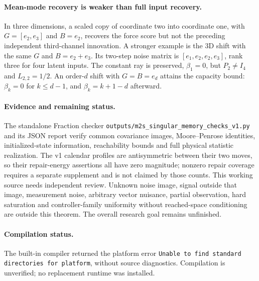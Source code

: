 \documentclass[11pt]{article}
\begin{document}
\paragraph{Mean-mode recovery is weaker than full input recovery.}
In three dimensions, a scaled copy of coordinate two into coordinate one,
with $G=[e_2,e_3]$ and $B=e_2$, recovers the force score but not the preceding
independent third-channel innovation.
A stronger example is the 3D shift with the same $G$ and $B=e_2+e_3$.
Its two-step noise matrix is $[e_1,e_2,e_2,e_3]$, rank three for four latent
inputs. The constant ray is preserved, $\beta_1=0$, but $P_2\ne I_4$ and
$L_{2,2}=1/2$.
An order-$d$ shift with $G=B=e_d$ attains the capacity bound:
$\beta_k=0$ for $k\le d-1$, and $\beta_k=k+1-d$ afterward.

\paragraph{Evidence and remaining status.}
The standalone Fraction checker
\texttt{outputs/m2s\_singular\_memory\_checks\_v1.py} and its JSON report verify
common covariance images, Moore--Penrose identities, initialized-state
information, reachability bounds and full physical statistic realization.
The v1 calendar profiles are antisymmetric between their two moves, so their
repair-energy assertions all have zero magnitude; nonzero repair coverage
requires a separate supplement and is not claimed by those counts.
This working source needs independent review.
Unknown noise image, signal outside that image, measurement noise, arbitrary
vector nuisance, partial observation, hard saturation and controller-family
uniformity without reached-space conditioning are outside this theorem.
The overall research goal remains unfinished.
\paragraph{Compilation status.}
The built-in compiler returned the platform error
\texttt{Unable to find standard directories for platform}, without source
diagnostics. Compilation is unverified; no replacement runtime was installed.
\end{document}
